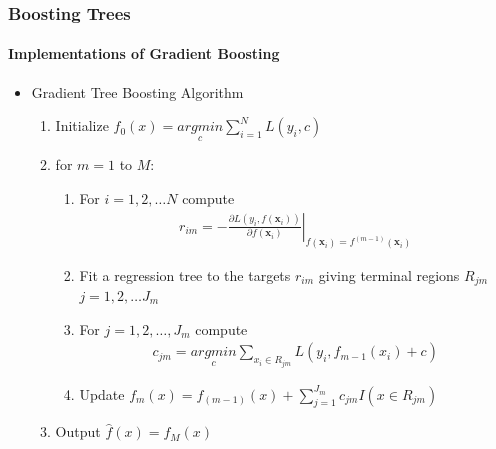 \documentclass[
  shownotes,
  xcolor={svgnames},
  hyperref={colorlinks,citecolor=DarkBlue,linkcolor=DarkRed,urlcolor=DarkBlue}
  , aspectratio=169]{beamer}
\begin{document}
\begin{frame}[fragile]
\frametitle{Boosting Trees}
\framesubtitle{Implementations of Gradient Boosting}

\begin{itemize}
\item Gradient Tree Boosting Algorithm

\begin{enumerate}
\item Initialize $f_0(x)=\underset{c}{argmin}\sum_{i=1}^N L(y_i,c)$
\item for $m=1$ to $M$:
  \begin{enumerate}
      \item For $i=1,2,\dots N$ compute 
      \begin{align}
        r_{im}=-\left.\frac{\partial L(y_i,f(\mathbf{x}_i))}{\partial f(\mathbf{x}_i)}\right\vert_{f(\mathbf{x}_i)=f^{(m-1)}(\mathbf{x}_i)}
      \end{align}
      \item Fit a regression tree to the targets $r_{im}$ giving terminal regions $R_{jm}$ $j=1,2,\dots J_m$
      \item For $j=1,2,\dots,J_m$ compute
      \begin{align}
       c_{jm} =\underset{c}{argmin} \sum_{x_i\in R_{jm} } L(y_i,f_{m-1}(x_i)+c)
      \end{align}
      \item Update $f_m (x)=f_{(m-1)}(x) + \sum_{j=1}^{J_m} c_{jm} I(x \in R_{jm})$
  \end{enumerate}
  \item Output $\hat{f}(x)=f_M(x)$
\end{enumerate}


\end{itemize}

\end{frame}

\end{document}
